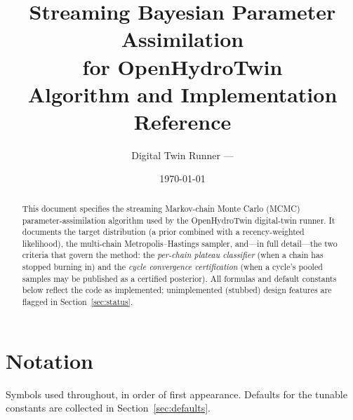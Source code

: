 \documentclass[11pt]{article}
\title{\bfseries Streaming Bayesian Parameter Assimilation\\ for OpenHydroTwin\\[4pt]
\large Algorithm and Implementation Reference}
\author{Digital Twin Runner --- \code{DTStreamingMCMC}}
\date{\today}
\begin{document}
\maketitle

\begin{abstract}
This document specifies the streaming Markov-chain Monte Carlo (MCMC)
parameter-assimilation algorithm used by the OpenHydroTwin digital-twin
runner. It documents the target distribution (a prior combined with a
recency-weighted likelihood), the multi-chain Metropolis--Hastings
sampler, and---in full detail---the two criteria that govern the method:
the \emph{per-chain plateau classifier} (when a chain has stopped
burning in) and the \emph{cycle convergence certification} (when a
cycle's pooled samples may be published as a certified posterior). All
formulas and default constants below reflect the code as implemented;
unimplemented (stubbed) design features are flagged in
Section~\ref{sec:status}.
\end{abstract}

\tableofcontents

\section{Notation}\label{sec:notation}

Symbols used throughout, in order of first appearance. Defaults for the
tunable constants are collected in Section~\ref{sec:defaults}.
\end{document}
